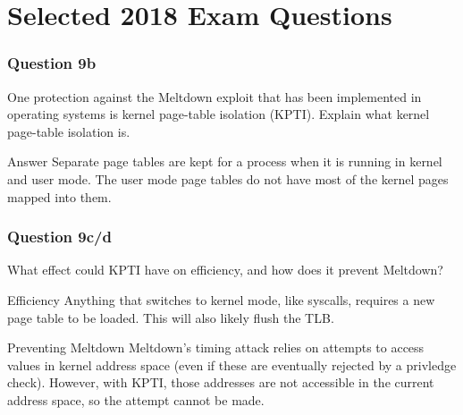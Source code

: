 \documentclass{beamer}
\begin{document}
\section{Selected 2018 Exam Questions}
\begin{frame}
  \frametitle{Question 9b}
  One protection against the Meltdown exploit that has been implemented in operating systems is kernel page-table isolation (KPTI). Explain what kernel page-table isolation is.
  \pause
  \begin{block}{Answer}
    Separate page tables are kept for a process when it is running in kernel and user mode. The user mode page tables do not have most of the kernel pages mapped into them.
  \end{block}
\end{frame}
\begin{frame}
  \frametitle{Question 9c/d}
  What effect could KPTI have on efficiency, and how does it prevent Meltdown?
  \pause
  \begin{block}{Efficiency}
    Anything that switches to kernel mode, like syscalls, requires a new page table to be loaded. This will also likely flush the TLB.
  \end{block}
  \pause
  \begin{block}{Preventing Meltdown}
    Meltdown's timing attack relies on attempts to access values in kernel address space (even if these are eventually rejected by a privledge check). However, with KPTI, those addresses are not accessible in the current address space, so the attempt cannot be made.
  \end{block}
\end{frame}
\end{document}
